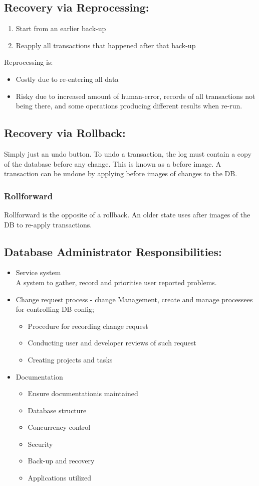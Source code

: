 \documentclass[a5paper]{article}
\begin{document}
	\subsection{Recovery via Reprocessing:}
	\begin{enumerate}
		\item Start from an earlier back-up
		\item Reapply all transactions that happened after that back-up
	\end{enumerate}
	Reprocessing is:
	\begin{itemize}
		\item Costly due to re-entering all data
		\item Risky due to increased amount of human-error, records of all transactions not being there, and some operations producing different results when re-run.
	\end{itemize}
	\subsection{Recovery via Rollback:}
	Simply just an undo button. To undo a transaction, the log must contain a copy of the database before any change. This is known as a before image. A transaction can be undone by applying before images of changes to the DB.
	\subsubsection{Rollforward}
	Rollforward is the opposite of a rollback. An older state uses after images of the DB to re-apply transactions.
	\subsection{Database Administrator Responsibilities:}
	\begin{itemize}
		\item Service system\\A system to gather, record and prioritise user reported problems.
		\item Change request process - change Management, create and manage processees for controlling DB config;
			\begin{itemize}
				\item Procedure for recording change request
				\item Conducting user and developer reviews of such request
				\item Creating projects and tasks
			\end{itemize}
		\item Documentation
			\begin{itemize}
				\item Ensure documentationis maintained
				\item Database structure
				\item Concurrency control
				\item Security
				\item Back-up and recovery
				\item Applications utilized
			\end{itemize}
	\end{itemize}
\end{document}
